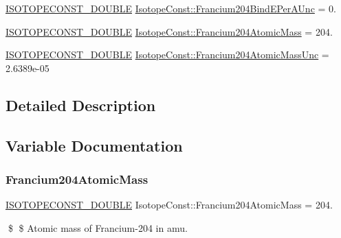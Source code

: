 \begin{DoxyCompactItemize}
\mbox{\hyperlink{group___isotope_const-_macros_ga8f45a7272ce02c0b4c65c44636ed719a}{I\+S\+O\+T\+O\+P\+E\+C\+O\+N\+S\+T\+\_\+\+D\+O\+U\+B\+LE}} \mbox{\hyperlink{group___isotope_const-_francium-_fr204_ga4806e929620ef58ee0ee6e43e40e3aae}{Isotope\+Const\+::\+Francium204\+Bind\+E\+Per\+A\+Unc}} = 0.
\item 
\mbox{\hyperlink{group___isotope_const-_macros_ga8f45a7272ce02c0b4c65c44636ed719a}{I\+S\+O\+T\+O\+P\+E\+C\+O\+N\+S\+T\+\_\+\+D\+O\+U\+B\+LE}} \mbox{\hyperlink{group___isotope_const-_francium-_fr204_gafccb34118343bad5fc5bb161e69d11f8}{Isotope\+Const\+::\+Francium204\+Atomic\+Mass}} = 204.
\item 
\mbox{\hyperlink{group___isotope_const-_macros_ga8f45a7272ce02c0b4c65c44636ed719a}{I\+S\+O\+T\+O\+P\+E\+C\+O\+N\+S\+T\+\_\+\+D\+O\+U\+B\+LE}} \mbox{\hyperlink{group___isotope_const-_francium-_fr204_gab0ba956930186de2a35f5faf3f4d098e}{Isotope\+Const\+::\+Francium204\+Atomic\+Mass\+Unc}} = 2.\+6389e-\/05
\end{DoxyCompactItemize}


\subsection{Detailed Description}


\subsection{Variable Documentation}
\mbox{\label{group___isotope_const-_francium-_fr204_gafccb34118343bad5fc5bb161e69d11f8}} 
\subsubsection{\texorpdfstring{Francium204\+Atomic\+Mass}{Francium204AtomicMass}}
{\footnotesize\ttfamily \mbox{\hyperlink{group___isotope_const-_macros_ga8f45a7272ce02c0b4c65c44636ed719a}{I\+S\+O\+T\+O\+P\+E\+C\+O\+N\+S\+T\+\_\+\+D\+O\+U\+B\+LE}} Isotope\+Const\+::\+Francium204\+Atomic\+Mass = 204.}

\$ \$ Atomic mass of Francium-\/204 in amu. \mbox{\label{group___isotope_const-_francium-_fr204_gab0ba956930186de2a35f5faf3f4d098e}} 
